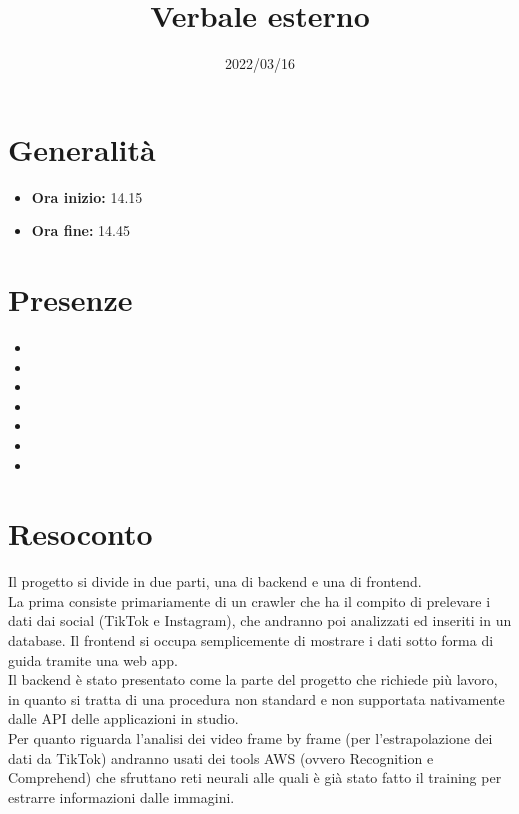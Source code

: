 \documentclass{classes/base}
\title{Verbale esterno}
\date{2022/03/16}
\author{\marcob}
\renewcommand{\maketitle}{
    
}
\begin{document}
    \maketitle

    \section*{Generalità}
    \begin{itemize}
        \item \textbf{Ora inizio:} 14.15
        \item \textbf{Ora fine:} 14.45
    \end{itemize}

    \section*{Presenze}
    \begin{itemize}
     	\item \angela
      	\item \marcob
       	\item \tommaso
        \item \ruth
        \item \matteo
        \item \marcov
        \item \giulio
    \end{itemize}

    \section*{Resoconto}
    Il progetto si divide in due parti, una di backend e una di frontend.\\
    La prima consiste primariamente di un crawler che ha il compito di prelevare i dati dai social (TikTok e Instagram), che andranno poi analizzati ed inseriti in un database.
    Il frontend si occupa semplicemente di mostrare i dati sotto forma di guida tramite una web app.\\
    Il backend è stato presentato come la parte del progetto che richiede più lavoro, in quanto si tratta di una procedura non standard e non supportata nativamente dalle API delle applicazioni in studio.\\
    Per quanto riguarda l'analisi dei video frame by frame (per l'estrapolazione dei dati da TikTok) andranno usati dei tools AWS (ovvero Recognition e Comprehend) che sfruttano reti neurali alle quali è già stato fatto il training per estrarre informazioni dalle immagini.
\end{document}
